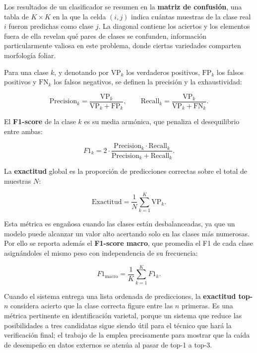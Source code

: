 Los resultados de un clasificador se resumen en la \textbf{matriz de
confusión}, una tabla de $K \times K$ en la que la celda $(i,j)$ indica
cuántas muestras de la clase real $i$ fueron predichas como clase $j$. La
diagonal contiene los aciertos y los elementos fuera de ella revelan qué
pares de clases se confunden, información particularmente valiosa en este
problema, donde ciertas variedades comparten morfología foliar.

Para una clase $k$, y denotando por $\mathrm{VP}_k$ los verdaderos
positivos, $\mathrm{FP}_k$ los falsos positivos y $\mathrm{FN}_k$ los falsos
negativos, se definen la precisión y la exhaustividad:

\begin{equation}
\mathrm{Precision}_{k} = \frac{\mathrm{VP}_{k}}{\mathrm{VP}_{k} + \mathrm{FP}_{k}},
\qquad
\mathrm{Recall}_{k} = \frac{\mathrm{VP}_{k}}{\mathrm{VP}_{k} + \mathrm{FN}_{k}}.
\label{eq:precision}
\end{equation}

El \textbf{F1-score} de la clase $k$ es su media armónica, que penaliza el
desequilibrio entre ambas:

\begin{equation}
F1_{k} = 2 \cdot \frac{\mathrm{Precision}_{k} \cdot \mathrm{Recall}_{k}}
                      {\mathrm{Precision}_{k} + \mathrm{Recall}_{k}}.
\label{eq:f1}
\end{equation}

La \textbf{exactitud} global es la proporción de predicciones correctas
sobre el total de muestras $N$:

\begin{equation}
\mathrm{Exactitud} = \frac{1}{N}\sum_{k=1}^{K} \mathrm{VP}_{k}.
\label{eq:exactitud}
\end{equation}

Esta métrica es engañosa cuando las clases están desbalanceadas, ya que un
modelo puede alcanzar un valor alto acertando solo en las clases más
numerosas. Por ello se reporta además el \textbf{F1-score macro}, que
promedia el F1 de cada clase asignándoles el mismo peso con independencia de
su frecuencia:

\begin{equation}
F1_{\text{macro}} = \frac{1}{K}\sum_{k=1}^{K} F1_{k}.
\label{eq:f1macro}
\end{equation}

Cuando el sistema entrega una lista ordenada de predicciones, la
\textbf{exactitud top-$n$} considera acierto que la clase correcta figure
entre las $n$ primeras. Es una métrica pertinente en identificación
varietal, porque un sistema que reduce las posibilidades a tres candidatas
sigue siendo útil para el técnico que hará la verificación final; el trabajo
de \citet{denart2024} la emplea precisamente para mostrar que la caída de
desempeño en datos externos se atenúa al pasar de top-1 a top-3.

